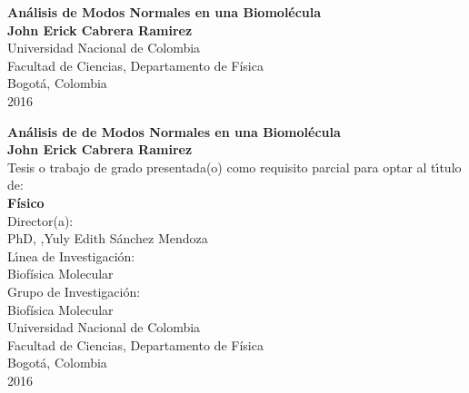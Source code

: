 \begin{center}
\begin{figure}
\centering%
%
\end{figure}
\thispagestyle{empty} \vspace*{2.0cm} \textbf{\huge
An\'{a}lisis de Modos Normales en una Biomol\'{e}cula}\\[6.0cm]
\Large\textbf{John Erick Cabrera Ramirez}\\[6.0cm]
\small Universidad Nacional de Colombia\\
Facultad de Ciencias, Departamento de F\'{i}sica\\
Bogot\'{a}, Colombia\\
2016\\
\end{center}

\newpage{\pagestyle{empty}\cleardoublepage}

\newpage
\begin{center}
\thispagestyle{empty} \vspace*{0cm} \textbf{\huge An\'{a}lisis de de Modos Normales en una Biomol\'{e}cula}\\[3.0cm]
\Large\textbf{John Erick Cabrera Ramirez}\\[3.0cm]
\small Tesis o trabajo de grado presentada(o) como requisito parcial para optar al t\'{\i}tulo de:\\
\textbf{F\'{i}sico}\\[2.5cm]
Director(a):\\
PhD, ,Yuly Edith S\'{a}nchez Mendoza \\[2.0cm]
L\'{\i}nea de Investigaci\'{o}n:\\
Biof\'{i}sica Molecular\\
Grupo de Investigaci\'{o}n:\\
Biof\'{i}sica Molecular\\[2.5cm]
Universidad Nacional de Colombia\\
Facultad de Ciencias, Departamento de F\'{i}sica\\
Bogot\'{a}, Colombia\\
2016\\
\end{center}

